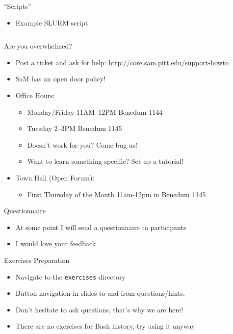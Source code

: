 \documentclass[hyperref={pdfpagelabels=false},12pt]{beamer}
\begin{document}
\begin{frame}{``Scripts''}
    \begin{itemize}
        \item Example SLURM script
    \end{itemize}
\inputminted[bgcolor=lightgray,linenos,fontsize=\footnotesize]{bash}{code/benzene.slurm}
\end{frame}

\begin{frame}{Are you overwhelmed?}
    \begin{itemize}
        \item Post a ticket and ask for help: \url{http://core.sam.pitt.edu/support-howto}
        \item SaM has an open door policy!
        \item Office Hours:
        \begin{itemize}
            \item Monday/Friday 11AM--12PM Benedum 1144
            \item Tuesday 2--3PM Benedum 1145 
            \item Doesn't work for you? Come bug us!
            \item Want to learn something specific? Set up a tutorial!
        \end{itemize}
        \item Town Hall (Open Forum):
        \begin{itemize}
            \item First Thursday of the Month 11am-12pm in Benedum 1145
        \end{itemize}
    \end{itemize}
\end{frame}

\begin{frame}{Questionnaire}
    \begin{itemize}
        \item At some point I will send a questionnaire to participants
        \item I would love your feedback
    \end{itemize}    
\end{frame}

\begin{frame}{Exercises Preparation}
    \begin{itemize}
        \item Navigate to the \texttt{exercises} directory
        \item Button navigation in slides to-and-from questions/hints.
        \item Don't hesitate to ask questions, that's why we are here!
        \item There are no exercises for Bash history, try using it anyway
    \end{itemize}
\end{frame}
\end{document}
